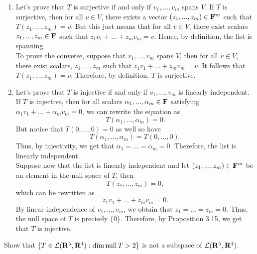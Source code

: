 \begin{solution}
    \begin{enumerate}[label=(\alph*)]
        \item Let's prove that $T$ is surjective if and only if $v_1, ..., v_m$ spans $V$. If $T$ is surjective, then for all $v \in V$, there exists a vector $(z_1, ..., z_m) \in \mathbf{F}^m$ such that $T(z_1, ..., z_m) = v$. But this just means that for all $v \in V$, there exist scalars $z_1, ..., z_m \in \mathbf{F}$ such that $z_1 v_1 + ... + z_m v_m = v$. Hence, by definition, the list is spanning. \\
        To prove the converse, suppose that $v_1, ..., v_m$ spans $V$, then for all $v \in V$, there exist scalars, $z_1, ..., z_m$ such that $z_1 v_1 + ... + z_m v_m = v$. It follows that $T(z_1, ..., z_m) = v$. Therefore, by definition, $T$ is surjective. 
        \item Let's prove that $T$ is injective if and only if $v_1, ..., v_m$ is linearly independent. If $T$ is injective, then for all scalars $\alpha_1, ..., \alpha_m \in \mathbf{F}$ satisfying $\alpha_1 v_1 + ... + \alpha_m v_m = 0$, we can rewrite the equation as 
        $$T(\alpha_1, ..., \alpha_m) = 0.$$
        But notice that $T(0,...,0) = 0$ as well so have
        $$T(\alpha_1, ..., \alpha_m) = T(0,...,0).$$
        Thus, by injectivity, we get that $\alpha_1 = ... = \alpha_m = 0$. Therefore, the list is linearly independent. \\
        Suppose now that the list is linearly independent and let $(z_1, ..., z_m) \in \mathbf{F}^m$ be an element in the null space of $T$, then 
        $$T(z_1, ..., z_m) = 0,$$
        which can be rewritten as 
        $$z_1 v_1 + ... + z_m v_m = 0.$$
        By linear independence of $v_1, ..., v_m$, we obtain that $z_1 = ... = z_m = 0$. Thus, the null space of $T$ is precisely $\{0\}$. Therefore, by Proposition 3.15, we get that $T$ is injective. \\
    \end{enumerate}
\end{solution}

\begin{exercise}
    Show that $\{T \in \mathcal{L}(\mathbf{R}^5, \mathbf{R}^4) : \dim \operatorname{\text{null}} T > 2\}$ is not a subspace of $\mathcal{L}(\mathbf{R}^5, \mathbf{R}^4)$. \\
\end{exercise}

